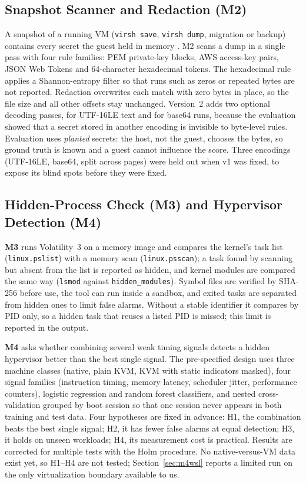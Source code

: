 \documentclass[conference]{IEEEtran}
\begin{document}
\subsection{Snapshot Scanner and Redaction (M2)}
A snapshot of a running VM (\texttt{virsh save}, \texttt{virsh dump}, migration or backup) contains every secret the guest held in memory \cite{survey}. M2 scans a dump in a single pass with four rule families: PEM private-key blocks, AWS access-key pairs, JSON Web Tokens and 64-character hexadecimal tokens. The hexadecimal rule applies a Shannon-entropy filter so that runs such as zeros or repeated bytes are not reported. Redaction overwrites each match with zero bytes in place, so the file size and all other offsets stay unchanged. Version~2 adds two optional decoding passes, for UTF-16LE text and for base64 runs, because the evaluation showed that a secret stored in another encoding is invisible to byte-level rules. Evaluation uses \emph{planted} secrets: the host, not the guest, chooses the bytes, so ground truth is known and a guest cannot influence the score. Three encodings (UTF-16LE, base64, split across pages) were held out when v1 was fixed, to expose its blind spots before they were fixed.

\subsection{Hidden-Process Check (M3) and Hypervisor Detection (M4)}
\textbf{M3} runs Volatility~3 \cite{volatility} on a memory image and compares the kernel's task list (\texttt{linux.pslist}) with a memory scan (\texttt{linux.psscan}); a task found by scanning but absent from the list is reported as hidden, and kernel modules are compared the same way (\texttt{lsmod} against \texttt{hidden\_modules}). Symbol files are verified by SHA-256 before use, the tool can run inside a sandbox, and exited tasks are separated from hidden ones to limit false alarms. Without a stable identifier it compares by PID only, so a hidden task that reuses a listed PID is missed; this limit is reported in the output.

\textbf{M4} asks whether combining several weak timing signals detects a hidden hypervisor better than the best single signal. The pre-specified design uses three machine classes (native, plain KVM, KVM with static indicators masked), four signal families (instruction timing, memory latency, scheduler jitter, performance counters), logistic regression and random forest classifiers, and nested cross-validation grouped by boot session so that one session never appears in both training and test data. Four hypotheses are fixed in advance: H1, the combination beats the best single signal; H2, it has fewer false alarms at equal detection; H3, it holds on unseen workloads; H4, its measurement cost is practical. Results are corrected for multiple tests with the Holm procedure. No native-versus-VM data exist yet, so H1--H4 are not tested; Section~\ref{sec:m4wsl} reports a limited run on the only virtualization boundary available to us.
\end{document}
